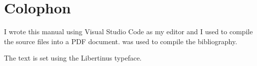 \chapter{Colophon}
I wrote this manual using Visual Studio Code as my editor and I used  to compile the source files into a \acs{PDF} document.
 was used to compile the bibliography.

The text is set using the Libertinus typeface.